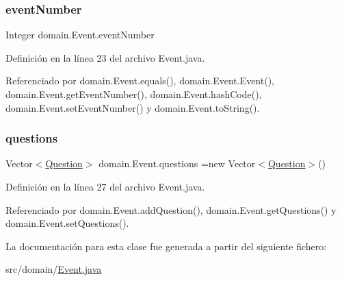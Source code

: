 \subsubsection{\texorpdfstring{eventNumber}{eventNumber}}
{\footnotesize\ttfamily Integer domain.\+Event.\+event\+Number\hspace{0.3cm}{\ttfamily [private]}}



Definición en la línea 23 del archivo Event.\+java.



Referenciado por domain.\+Event.\+equals(), domain.\+Event.\+Event(), domain.\+Event.\+get\+Event\+Number(), domain.\+Event.\+hash\+Code(), domain.\+Event.\+set\+Event\+Number() y domain.\+Event.\+to\+String().

\mbox{\label{classdomain_1_1Event_ab5621abc5bae7bc3d8ece713fa2e1e38}} 
\subsubsection{\texorpdfstring{questions}{questions}}
{\footnotesize\ttfamily Vector$<$\mbox{\hyperlink{classdomain_1_1Question}{Question}}$>$ domain.\+Event.\+questions =new Vector$<$\mbox{\hyperlink{classdomain_1_1Question}{Question}}$>$()\hspace{0.3cm}{\ttfamily [private]}}



Definición en la línea 27 del archivo Event.\+java.



Referenciado por domain.\+Event.\+add\+Question(), domain.\+Event.\+get\+Questions() y domain.\+Event.\+set\+Questions().



La documentación para esta clase fue generada a partir del siguiente fichero\+:\begin{DoxyCompactItemize}
\item 
src/domain/\mbox{\hyperlink{Event_8java}{Event.\+java}}\end{DoxyCompactItemize}
